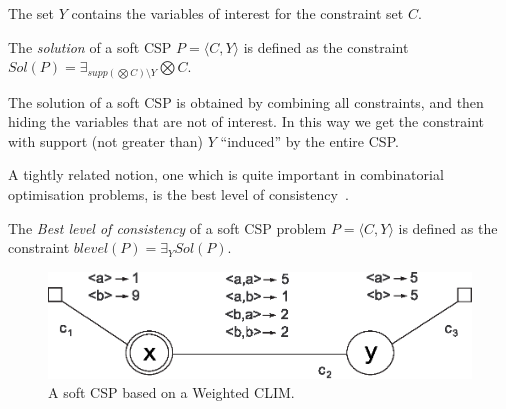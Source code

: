 \documentclass[main.tex]{subfiles}
\begin{document}
The set $Y$ contains the variables of interest for the constraint
set $C$.

\begin{definition}[Solutions]
  The \emph{solution} of a soft CSP $P = \langle C,Y \rangle$ is
  defined as the constraint $Sol({P})=\exists_{supp(\bigotimes C) \setminus Y} \bigotimes C$.
\end{definition}

The solution of a soft CSP is obtained by combining all
constraints, and then hiding the variables that are not of interest.
%
In this way we get the constraint with support (not greater than) $Y$
``induced'' by the entire CSP.

\smallskip
A tightly related notion, one which is quite important in
combinatorial optimisation problems, is the best level of
consistency~\cite{jacm}.

\begin{definition}
  The \emph{Best level of consistency} of a soft CSP problem $P =
  \langle C,Y \rangle$ is defined as the constraint $blevel(P) =
  \exists_Y Sol({P})$.
\end{definition}



\begin{figure}
\centering
\includegraphics[scale=0.57]{wexample.eps} %
\caption{A soft CSP based on a Weighted CLIM.}
\label{figure:wexample}
\end{figure}
\end{document}
